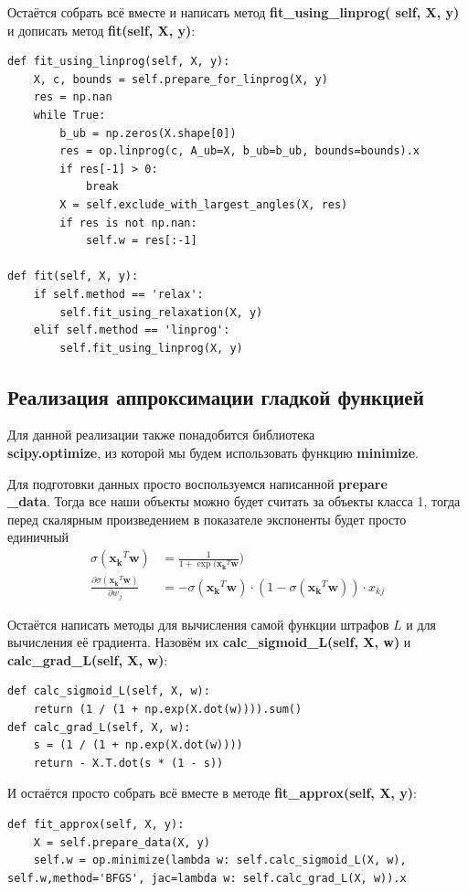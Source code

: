 \documentclass[a4paper]{article}
\newcommand{\w}{\bm{w}}
\newcommand{\xk}{\bm{x_k}}
\newcommand{\xkj}{x_{kj}}
\begin{document}
Остаётся собрать всё вместе и написать метод \textbf{fit\_using\_linprog( self, X, y)} и дописать метод \textbf{fit(self, X, y)}:
\begin{lstlisting}
def fit_using_linprog(self, X, y):
	X, c, bounds = self.prepare_for_linprog(X, y)
	res = np.nan
	while True:
		b_ub = np.zeros(X.shape[0])
		res = op.linprog(c, A_ub=X, b_ub=b_ub, bounds=bounds).x
		if res[-1] > 0:
			break
		X = self.exclude_with_largest_angles(X, res)
		if res is not np.nan:
			self.w = res[:-1]
            
def fit(self, X, y):
	if self.method == 'relax':
		self.fit_using_relaxation(X, y)
	elif self.method == 'linprog':
		self.fit_using_linprog(X, y)
\end{lstlisting}

\subsection{Реализация аппроксимации гладкой функцией}

Для данной реализации также понадобится библиотека\\ \textbf{scipy.optimize}, из которой мы будем использовать функцию \textbf{minimize}.

Для подготовки данных просто воспользуемся написанной \textbf{prepare\\\_data}. Тогда все наши объекты можно будет считать за объекты класса 1, тогда перед скалярным произведением в показателе экспоненты будет просто единичный 
\begin{align*}
\sigma(\xk^T\w) & = \frac{1}{1 + \exp(\xk^T\w})\\
\frac{\partial \sigma(\xk^T\w)}{\partial w_j} & = - \sigma(\xk^T\w) \cdot (1 - \sigma(\xk^T\w)) \cdot \xkj 
\end{align*}

Остаётся написать методы для вычисления самой функции штрафов $L$ и для вычисления её градиента. Назовём их \textbf{calc\_sigmoid\_L(self, X, w)} и \textbf{calc\_grad\_L(self, X, w)}:
\begin{lstlisting}
def calc_sigmoid_L(self, X, w):
	return (1 / (1 + np.exp(X.dot(w)))).sum()
def calc_grad_L(self, X, w):
	s = (1 / (1 + np.exp(X.dot(w))))
	return - X.T.dot(s * (1 - s))
\end{lstlisting}

И остаётся просто собрать всё вместе в методе \textbf{fit\_approx(self, X, y)}:
\begin{lstlisting}
def fit_approx(self, X, y):
	X = self.prepare_data(X, y)
	self.w = op.minimize(lambda w: self.calc_sigmoid_L(X, w), self.w,method='BFGS', jac=lambda w: self.calc_grad_L(X, w)).x
\end{lstlisting}
\end{document}

